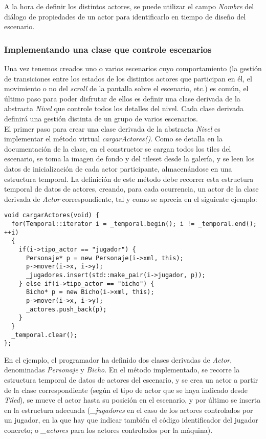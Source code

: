 A la hora de definir los distintos actores, se puede utilizar el campo \emph{Nombre} del diálogo de propiedades de un actor para identificarlo en tiempo de diseño del escenario.\\

\subsubsection{Implementando una clase que controle escenarios}

Una vez tenemos creados uno o varios escenarios cuyo comportamiento (la gestión de transiciones entre los estados de los distintos actores que participan en él, el movimiento o no del \emph{scroll} de la pantalla sobre el escenario, etc.) es común, el último paso para poder disfrutar de ellos es definir una clase derivada de la abstracta \emph{Nivel} que controle todos los detalles del nivel. Cada clase derivada definirá una gestión distinta de un grupo de varios escenarios.\\

El primer paso para crear una clase derivada de la abstracta \emph{Nivel} es implementar el método virtual \emph{cargarActores()}. Como se detalla en la documentación de la clase, en el constructor se cargan todos los tiles del escenario, se toma la imagen de fondo y del tileset desde la galería, y se leen los datos de inicialización de cada actor participante, almacenándose en una estructura temporal. La definición de este método debe recorrer esta estructura temporal de datos de actores, creando, para cada ocurrencia, un actor de la clase derivada de \emph{Actor} correspondiente, tal y como se aprecia en el siguiente ejemplo:

\begin{lstlisting}[style=C++]
void cargarActores(void) {
  for(Temporal::iterator i = _temporal.begin(); i != _temporal.end(); ++i)
  {
    if(i->tipo_actor == "jugador") {
      Personaje* p = new Personaje(i->xml, this);
      p->mover(i->x, i->y);
      _jugadores.insert(std::make_pair(i->jugador, p));
    } else if(i->tipo_actor == "bicho") {
      Bicho* p = new Bicho(i->xml, this);
      p->mover(i->x, i->y);
      _actores.push_back(p);
    }
  }
  _temporal.clear();
};
\end{lstlisting}

En el ejemplo, el programador ha definido dos clases derivadas de \emph{Actor}, denominadas \emph{Personaje} y \emph{Bicho}. En el método implementado, se recorre la estructura temporal de datos de actores del escenario, y se crea un actor a partir de la clase correspondiente (según el tipo de actor que se haya indicado desde \emph{Tiled}), se mueve el actor hasta su posición en el escenario, y por último se inserta en la estructura adecuada (\emph{\_jugadores} en el caso de los actores controlados por un jugador, en la que hay que indicar también el código identificador del jugador concreto; o \emph{\_actores} para los actores controlados por la máquina).\\

